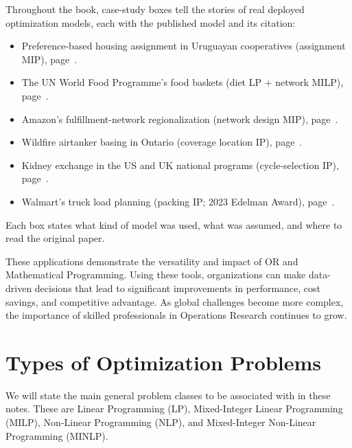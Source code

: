 \begin{tcolorbox}[colback=blue!4!white, colframe=blue!55!black,
  title=\textbf{Case studies in this book}]
Throughout the book, case-study boxes tell the stories of real deployed
optimization models, each with the published model and its citation:
\begin{itemize}
\item Preference-based housing assignment in Uruguayan cooperatives (assignment MIP), page~\pageref{case:housing-uruguay}.
\item The UN World Food Programme's food baskets (diet LP + network MILP), page~\pageref{case:wfp}.
\item Amazon's fulfillment-network regionalization (network design MIP), page~\pageref{case:amazon-regionalization}.
\item Wildfire airtanker basing in Ontario (coverage location IP), page~\pageref{case:wildfire-airtankers}.
\item Kidney exchange in the US and UK national programs (cycle-selection IP), page~\pageref{case:kidney-exchange}.
\item Walmart's truck load planning (packing IP; 2023 Edelman Award), page~\pageref{case:walmart-loads}.
\end{itemize}
Each box states what kind of model was used, what was assumed, and where to
read the original paper.
\end{tcolorbox}

These applications demonstrate the versatility and impact of OR and Mathematical Programming. Using these tools, organizations can make data-driven decisions that lead to significant improvements in performance, cost savings, and competitive advantage. As global challenges become more complex, the importance of skilled professionals in Operations Research continues to grow.

\section{Types of Optimization Problems}
\label{sec:types-of-optimization}
We will state the main general problem classes to be associated with in these notes.  These are Linear Programming (LP), Mixed-Integer Linear Programming (MILP), Non-Linear Programming (NLP), and Mixed-Integer Non-Linear Programming (MINLP).  

\begin{center}
\par{}\label{fig:tree-diagram-types}%

\end{center}


